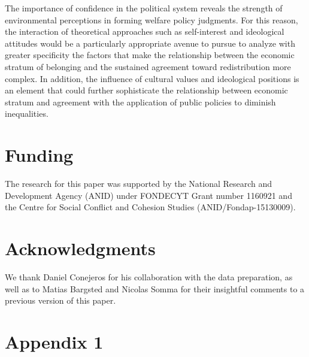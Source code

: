 \documentclass[utf8]{frontiersSCNS} %
\begin{document}
The importance of confidence in the political system reveals the strength of environmental perceptions in forming welfare policy judgments. For this reason, the interaction of theoretical approaches such as self-interest and ideological attitudes would be a particularly appropriate avenue to pursue to analyze with greater specificity the factors that make the relationship between the economic stratum of belonging and the sustained agreement toward redistribution more complex. In addition, the influence of cultural values and ideological positions is an element that could further sophisticate the relationship between economic stratum and agreement with the application of public policies to diminish inequalities.

\section*{Funding}
The research for this paper was supported by the National Research and
Development Agency (ANID) under FONDECYT Grant number 1160921 and the Centre for Social Conflict and Cohesion Studies (ANID/Fondap-15130009).

\section*{Acknowledgments}
We thank Daniel Conejeros for his collaboration with the data preparation, as well as to Matias Bargsted and Nicolas Somma for their insightful comments to a previous version of this paper.

\theendnotes

\printbibliography

\newpage

\section{Appendix 1}
\end{document}
